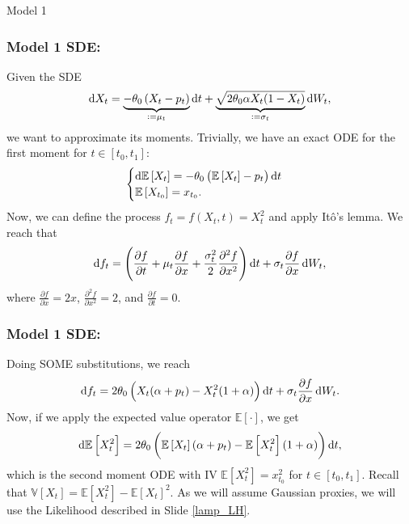 \documentclass[aspectratio=169]{beamer}\usepackage[utf8]{inputenc}
\newcommand{\E}{\mathbb{E}}
\newcommand{\V}{\mathbb{V}}
\begin{document}

\begin{frame}

{\Huge Model 1}

\end{frame}


\begin{frame}\frametitle{Model 1 SDE:}

Given the SDE
\begin{equation*}
\dif X_t=\underbrace{-\theta_0\left(X_t-p_t\right)}_{:=\mu_t}\dif t+\underbrace{\sqrt{2\theta_0\alpha X_t(1-X_t)}}_{:=\sigma_t}\dif W_t,
\end{equation*}
we want to approximate its moments. Trivially, we have an exact ODE for the first moment for $t\in[t_0,t_1]$:
\begin{equation*}
\begin{cases}
\dif \E\left[X_t\right]=-\theta_0\left(\E\left[X_t\right]-p_t\right)\dif t\\
\E\left[X_{t_0}\right]=x_{t_0}.
\end{cases}
\end{equation*}
Now, we can define the process $f_t=f(X_t,t)=X^2_t$ and apply It\^o's lemma. We reach that
\begin{equation*}
\dif f_t=\left(\frac{\partial f}{\partial t}+\mu_t\frac{\partial f}{\partial x}+\frac{\sigma^2_t}{2}\frac{\partial^2f}{\partial x^2}\right)\dif t+\sigma_t\frac{\partial f}{\partial x}\dif W_t,
\end{equation*}
where $\frac{\partial f}{\partial x}=2x$, $\frac{\partial^2 f}{\partial x^2}=2$, and $\frac{\partial f}{\partial t}=0$.

\end{frame}


\begin{frame}\frametitle{Model 1 SDE:}

Doing SOME substitutions, we reach
\begin{equation*}
\dif f_t=2\theta_0\left(X_t(\alpha+p_t)-X^2_t(1+\alpha)\right)\dif t+\sigma_t\frac{\partial f}{\partial x}\dif W_t.
\end{equation*}
Now, if we apply the expected value operator $\E[\cdot]$, we get
\begin{equation*}
\dif\E\left[X^2_t\right]=2\theta_0\left(\E\left[X_t\right](\alpha+p_t)-\E\left[X^2_t\right](1+\alpha)\right)\dif t,
\end{equation*}
which is the second moment ODE with IV $\E\left[X^2_t\right]=x_{t_0}^2$ for $t\in[t_0,t_1]$. Recall that $\V\left[X_t\right]=\E\left[X_t^2\right]-\E\left[X_t\right]^2$. As we will assume Gaussian proxies, we will use the Likelihood described in Slide {\color{blue}\ref{lamp_LH}}.

\end{frame}
\end{document}
